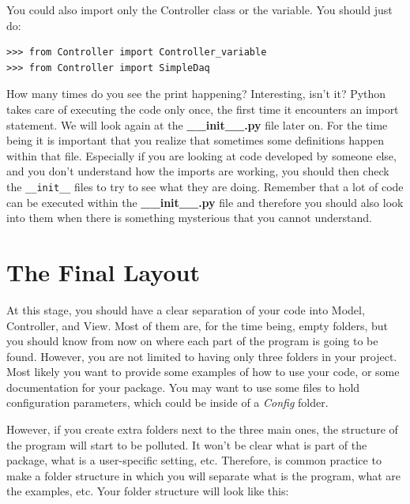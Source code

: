 You could also import only the Controller class or the variable. You should just do:

\begin{verbatim}
>>> from Controller import Controller_variable
>>> from Controller import SimpleDaq
\end{verbatim}

How many times do you see the print happening? Interesting, isn't it? Python takes care of executing the code only once, the first time it
encounters an import statement. We will look again at the \textbf{\_\_init\_\_.py} file later on. For the time being it is
important that you realize that sometimes some definitions happen within that file. Especially if you are looking at code developed by someone else, and you don't understand how the imports are working, you should then check the \texttt{\_\_init\_\_} files to try to see what they are doing. Remember that a lot of code can be executed within the \textbf{\_\_init\_\_.py} file and therefore you should also look into them when there is
something mysterious that you cannot understand.


\section{The Final Layout}\label{the-finallayout}
At this stage, you should have a clear separation of your code into Model, Controller, and View. Most of them are, for the time being, empty folders, but you should know from now on where each part of the program is going to be found. However, you are not limited to having only three folders in your project. Most likely you want to provide some examples of how to use your code, or some documentation for your package. You may want to use some files to hold configuration parameters, which could be inside of a \emph{Config} folder.

However, if you create extra folders next to the three main ones, the structure of the program will start to be polluted. It won't be clear what is part of the package, what is a user-specific setting, etc. Therefore, is common practice to make a folder structure in which you will separate what is the program, what are the examples, etc. Your folder structure will look like this:

